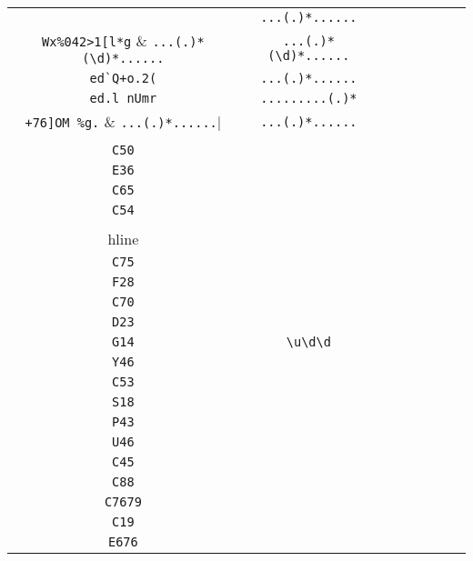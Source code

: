 \begin{longtable}{cccccccc}
\begin{tabular}{ll}
    \verb|"X[q/.2oDhQU| & \verb|...(.)*......|\\
\verb|Wx%042>1[l*g| & \verb|...(.)*(\d)*......|\\
\verb|ed`Q+o.2(| & \verb|...(.)*......|\\
\verb|ed.l nUmr| & \verb|.........(.)*|\\
\verb|+76]OM %g.| & \verb|...(.)*......|
\end{tabular}
\\\midrule 
\begin{tabular}{l}
    \verb|D12|\\
\verb|C50|\\
\verb|E36|\\
\verb|C65|\\
\verb|C54|\\
\\hline\\
\verb|C75|\\
\verb|F28|\\
\verb|C70|\\
\verb|D23|\\
\verb|G14|
\end{tabular}

&
\verb|\u\d\d|
&

\begin{tabular}{l}
    \verb|\u\d\d|\\
\verb|Y46|\\
\verb|C53|\\
\verb|S18|\\
\verb|P43|\\
\verb|U46|
\end{tabular}

&

\begin{tabular}{l}
    \verb.((\u)*(\d)*)|(C)\d\d.\\
\verb|C45|\\
\verb|C88|\\
\verb|C7679|\\
\verb|C19|\\
\verb|E676|
\end{tabular}

&


\end{longtable}
